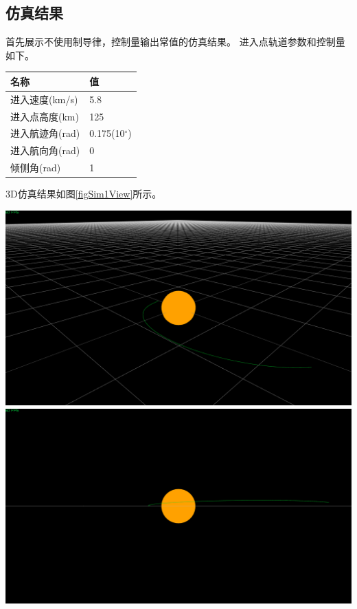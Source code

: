 \subsection{仿真结果}
首先展示不使用制导律，控制量输出常值的仿真结果。
进入点轨道参数和控制量如下。
\begin{center}\begin{tabular}{ll}
    \toprule
    名称 & 值 \\
    \midrule
    进入速度(km/s) & 5.8 \\
    进入点高度(km) & 125 \\
    进入航迹角(rad) & 0.175(10$^\circ$) \\
    进入航向角(rad) & 0 \\
    倾侧角(rad) & 1 \\
    \bottomrule
\end{tabular}\end{center}
3D仿真结果如图\ref{figSim1View}所示。
\begin{center}
	\includegraphics[scale=0.2]{sim1Verticalview.png}  \\
	\includegraphics[scale=0.2]{sim1Sideview.png}  \\
	\label{figSim1View}
\end{center}
